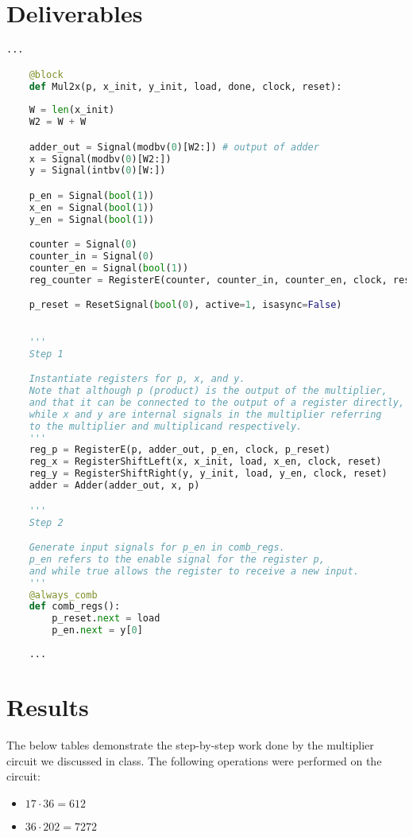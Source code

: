 \documentclass{article}
\begin{document}
\section{Deliverables}
    \begin{lstlisting}[language=Python,frame=tb]
    ...

    @block
    def Mul2x(p, x_init, y_init, load, done, clock, reset):
    
    W = len(x_init)
    W2 = W + W

    adder_out = Signal(modbv(0)[W2:]) # output of adder
    x = Signal(modbv(0)[W2:]) 
    y = Signal(intbv(0)[W:])

    p_en = Signal(bool(1)) 
    x_en = Signal(bool(1))
    y_en = Signal(bool(1))

    counter = Signal(0)
    counter_in = Signal(0)
    counter_en = Signal(bool(1))
    reg_counter = RegisterE(counter, counter_in, counter_en, clock, reset) 

    p_reset = ResetSignal(bool(0), active=1, isasync=False)

    
    '''
    Step 1

    Instantiate registers for p, x, and y.
    Note that although p (product) is the output of the multiplier,
    and that it can be connected to the output of a register directly,
    while x and y are internal signals in the multiplier referring
    to the multiplier and multiplicand respectively.
    ''' 
    reg_p = RegisterE(p, adder_out, p_en, clock, p_reset)   
    reg_x = RegisterShiftLeft(x, x_init, load, x_en, clock, reset)
    reg_y = RegisterShiftRight(y, y_init, load, y_en, clock, reset)
    adder = Adder(adder_out, x, p)

    '''
    Step 2

    Generate input signals for p_en in comb_regs.
    p_en refers to the enable signal for the register p,
    and while true allows the register to receive a new input.
    '''
    @always_comb
    def comb_regs():
        p_reset.next = load
        p_en.next = y[0]
    
    ...
    \end{lstlisting}

\break
\section{Results}
The below tables demonstrate the step-by-step work done by the multiplier circuit we discussed in class. The following operations were performed on the circuit:
\begin{itemize}
    \item $17 \cdot 36 = 612$
    \item $36 \cdot 202 = 7272$
\end{itemize}
\end{document}
